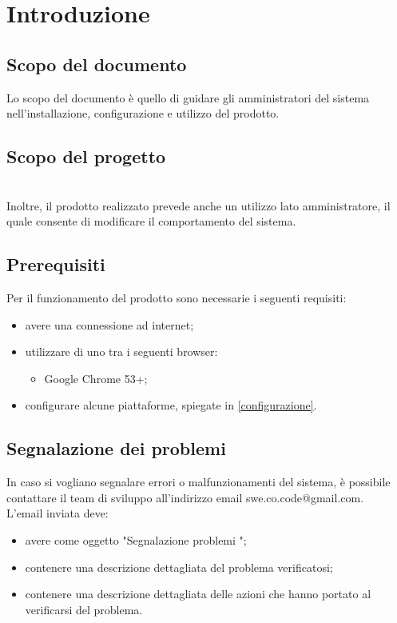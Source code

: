 \section{Introduzione}
\subsection{Scopo del documento}
Lo scopo del documento è quello di guidare gli amministratori del sistema nell'installazione, configurazione e utilizzo del prodotto.
\subsection{Scopo del progetto}
\SCOPO\\
Inoltre, il prodotto realizzato prevede anche un utilizzo lato amministratore, il quale consente di modificare il comportamento del sistema.
\subsection{Prerequisiti}
Per il funzionamento del prodotto sono necessarie i seguenti requisiti:
\begin{itemize}
	\item avere una connessione ad internet;
	\item utilizzare di uno tra i seguenti browser:
	\begin{itemize}
		\item Google Chrome 53+;
	\end{itemize}
	\item configurare alcune piattaforme, spiegate in \ref{configurazione}.
\end{itemize}
\subsection{Segnalazione dei problemi}
In caso si vogliano segnalare errori o malfunzionamenti del sistema, è possibile contattare il team di sviluppo \GRUPPO{} all'indirizzo email swe.co.code@gmail.com. \\
L'email inviata deve:
\begin{itemize}
	\item avere come oggetto "Segnalazione problemi \PROGETTO";
	\item contenere una descrizione dettagliata del problema verificatosi;
	\item contenere una descrizione dettagliata delle azioni che hanno portato al verificarsi del problema.
\end{itemize}